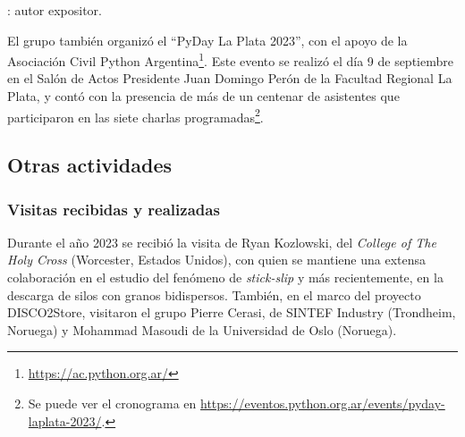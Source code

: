 \documentclass[a4paper,11pt,twoside,final,titlepage,onecolumn,openright]{report}
\begin{document}
{\small *: autor expositor.}

El grupo también organizó el ``PyDay La Plata 2023'', con el apoyo de la Asociación Civil Python Argentina\footnote{\url{https://ac.python.org.ar/}}. Este evento se realizó el día 9 de septiembre en el Salón de Actos Presidente Juan Domingo Perón de la Facultad Regional La Plata, y contó con la presencia de más de un centenar de asistentes que participaron en las siete charlas programadas\footnote{Se puede ver el cronograma en \url{https://eventos.python.org.ar/events/pyday-laplata-2023/}.}.


\subsection{Otras actividades}

\subsubsection{Visitas recibidas y realizadas}

Durante el año 2023 se recibió la visita de Ryan Kozlowski, del \textit{College of The Holy Cross} (Worcester, Estados Unidos), con quien se mantiene una extensa colaboración en el estudio del fenómeno de \textit{stick-slip} y más recientemente, en la descarga de silos con granos bidispersos. También, en el marco del proyecto DISCO2Store, visitaron el grupo Pierre Cerasi, de SINTEF Industry (Trondheim, Noruega) y Mohammad Masoudi de la Universidad de Oslo (Noruega).

% 
% 
% 
%  
\end{document}
